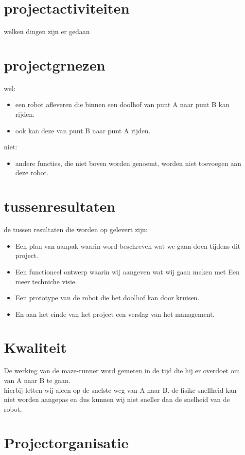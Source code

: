 \documentclass[oneside]{book}
\begin{document}
\chapter{projectactiviteiten}
welken dingen zijn er gedaan
\clearpage
\chapter{projectgrnezen}
wel:\\
\begin{itemize}
	\item een robot afleveren die binnen een doolhof van punt A naar punt 
	B kan rijden.
	\item ook kan deze van punt B naar punt A rijden.
\end{itemize}
niet:\\
\begin{itemize}
	\item andere functies, die niet boven worden genoemt, worden niet toevoegen aan deze robot.
\end{itemize}
\clearpage
\chapter{tussenresultaten}
	de tussen resultaten die worden op gelevert zijn:
\begin{itemize}
	\item Een plan van aanpak waarin word beschreven wat we gaan doen tijdens dit project.
	\item Een functioneel ontwerp waarin wij aangeven wat wij gaan maken met Een meer techniche visie.
	\item Een prototype van de robot die het doolhof kan door kruisen.
	\item En aan het einde van het project een verslag van het management.
\end{itemize}
\clearpage
\chapter{Kwaliteit}
	De werking van de maze-runner word gemeten in de tijd die hij er overdoet om van A naar B te gaan.\\
	hierbij letten wij aleen op de snelste weg van A naar B. de fisike snellheid kan niet worden aangepas en dus kunnen wij niet sneller dan de snelheid van de robot.
\clearpage
\chapter{Projectorganisatie}
\end{document}
